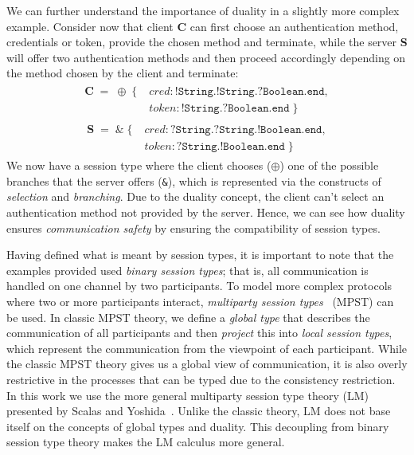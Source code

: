 \documentclass{article}
\newcommand{\type}[1]{\texttt{#1}}
\begin{document}
We can further understand the importance of duality in a slightly more complex example. Consider now that client \textbf{C} can first choose an authentication method, credentials or token, provide the chosen method and terminate, while the server \textbf{S} will offer two authentication methods and then proceed accordingly depending on the method chosen by the client and terminate:
\begin{align*}
    \begin{split}
        \textbf{C} \; = \; \oplus \;\{\; &\textit{cred}: \type{!String.!String.?Boolean.end}, \\ & \textit{token}: \type {!String.?Boolean.end} \;\}\;
    \end{split}
\end{align*}
\begin{align*}
    \begin{split}
       \textbf{S} \; = \; \& \;\{\; &\textit{cred}: \type{?String.?String.!Boolean.end}, \\ & \textit{token}: \type {?String.!Boolean.end} \;\}\;
    \end{split}
\end{align*}
We now have a session type where the client chooses (\type{$\oplus$}) one of the possible branches that the server offers (\type{\&}), which is represented via the constructs of \textit{selection} and \textit{branching}. Due to the duality concept, the client can't select an authentication method not provided by the server. Hence, we can see how duality ensures \textit{communication safety} by ensuring the compatibility of session types.

Having defined what is meant by session types, it is important to note that the examples provided used \textit{binary session types}; that is, all communication is handled on one channel by two participants. 
To model more complex protocols where two or more participants interact, \textit{multiparty session types}~\cite{HYC16} (MPST) can be used. 
In classic MPST theory, we define a \textit{global type} that describes the communication of all participants and then \textit{project} this into \textit{local session types}, which represent the communication from the viewpoint of each participant.
While the classic MPST theory gives us a global view of communication, it is also overly restrictive in the processes that can be typed due to the consistency restriction.
In this work we use the more general multiparty session type theory (LM) presented by Scalas and Yoshida~\cite{SY19}.
Unlike the classic theory, LM does not base itself on the concepts of global types and duality.
This decoupling from binary session type theory makes the LM calculus more general.
\end{document}
